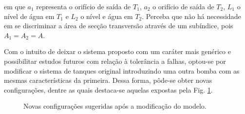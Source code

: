 \noindent em que $a_1$ representa o orifício de saída de $T_1$, $a_2$ o orifício
de saída de $T_2$, $L_1$ o nível de água em $T_1$ e $L_2$ o nível e água em
$T_2$. Perceba que não há necessidade em se discriminar a área de secção
transversão através de um subíndice, pois $A_1 = A_2 = A$.

Com o intuito de deixar o sistema proposto com um caráter mais genérico e
possibilitar estudos futuros com relação à tolerância a falhas, optou-se por
modificar o sistema de tanques original introduzindo uma outra bomba com as
mesmas características da primeira. Dessa forma, pôde-se obter novas
configurações, dentre as quais destaca-se aquelas expostas pela Fig.
\ref{fig:novas_config}.

\begin{figure}[htb]
\centering
{}
\caption{Novas configurações sugeridas após a modificação do modelo.}
\label{fig:novas_config}
\end{figure}

